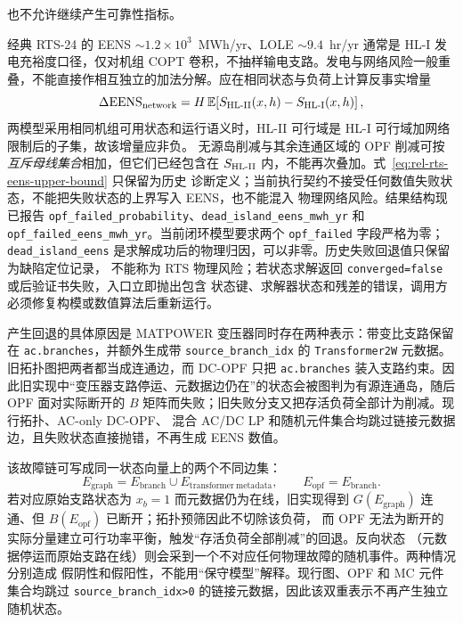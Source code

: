 也不允许继续产生可靠性指标。
\begin{boundarynote}
经典 RTS-24 的 EENS $\sim1.2\times10^3$~MWh/yr、LOLE $\sim9.4$~hr/yr 通常是 HL-I 发电充裕度口径，仅对机组 COPT 卷积，不抽样输电支路。发电与网络风险一般重叠，不能直接作相互独立的加法分解。应在相同状态与负荷上计算反事实增量
\begin{equation}
 \Delta\mathrm{EENS}_{\rm network}
 =H\,\mathbb E\!\left[S_{\rm HL\text{-}II}(x,h)-S_{\rm HL\text{-}I}(x,h)\right],
 \label{eq:rel-rts-network-increment}
\end{equation}
两模型采用相同机组可用状态和运行语义时，HL-II 可行域是 HL-I 可行域加网络限制后的子集，故该增量应非负。
无源岛削减与其余连通区域的 OPF 削减可按\emph{互斥母线集合}相加，但它们已经包含在
$S_{\rm HL\text{-}II}$ 内，不能再次叠加。式~\eqref{eq:rel-rts-eens-upper-bound} 只保留为历史
诊断定义；当前执行契约不接受任何数值失败状态，不能把失败状态的上界写入 EENS，也不能混入
物理网络风险。结果结构现已报告
\texttt{opf\_failed\_probability}、\texttt{dead\_island\_eens\_mwh\_yr} 和
\texttt{opf\_failed\_eens\_mwh\_yr}。当前闭环模型要求两个 \texttt{opf\_failed} 字段严格为零；
\texttt{dead\_island\_eens} 是求解成功后的物理归因，可以非零。历史失败回退值只保留为缺陷定位记录，
不能称为 RTS 物理风险；若状态求解返回 \texttt{converged=false} 或后验证书失败，入口立即抛出包含
状态键、求解器状态和残差的错误，调用方必须修复构模或数值算法后重新运行。

产生回退的具体原因是 MATPOWER 变压器同时存在两种表示：带变比支路保留在 \texttt{ac.branches}，并额外生成带
\texttt{source\_branch\_idx} 的 \texttt{Transformer2W} 元数据。旧拓扑图把两者都当成连通边，而 DC-OPF 只把 \texttt{ac.branches}
装入支路约束。因此旧实现中“变压器支路停运、元数据边仍在”的状态会被图判为有源连通岛，随后
OPF 面对实际断开的 $B$ 矩阵而失败；旧失败分支又把存活负荷全部计为削减。现行拓扑、AC-only DC-OPF、
混合 AC/DC LP 和随机元件集合均跳过链接元数据边，且失败状态直接抛错，不再生成 EENS 数值。

该故障链可写成同一状态向量上的两个不同边集：
\begin{equation}
 E_{\mathrm{graph}}=E_{\mathrm{branch}}\cup E_{\mathrm{transformer\ metadata}},\qquad
 E_{\mathrm{opf}}=E_{\mathrm{branch}} .
\end{equation}
若对应原始支路状态为 $x_b=1$ 而元数据仍为在线，旧实现得到
$G(E_{\mathrm{graph}})$ 连通、但 $B(E_{\mathrm{opf}})$ 已断开；拓扑预筛因此不切除该负荷，
而 OPF 无法为断开的实际分量建立可行功率平衡，触发“存活负荷全部削减”的回退。反向状态
（元数据停运而原始支路在线）则会采到一个不对应任何物理故障的随机事件。两种情况分别造成
假阴性和假阳性，不能用“保守模型”解释。现行图、OPF 和 MC 元件集合均跳过
\texttt{source\_branch\_idx>0} 的链接元数据，因此该双重表示不再产生独立随机状态。


\end{boundarynote}

